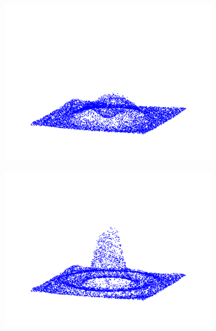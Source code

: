 \documentclass[11pt]{article}
\begin{document}
\begin{figure}
\begin{subfigure}{0.33\textwidth}
    \centering
    \includegraphics[width=1.\textwidth]{img/distrib_70.png}
\end{subfigure}%
\begin{subfigure}{0.33\textwidth}
    \centering
    \includegraphics[width=1.\textwidth]{img/distrib_120.png}
\end{subfigure}%
\begin{subfigure}{0.33\textwidth}
    \centering

\end{subfigure}
\end{figure}
\end{document}
